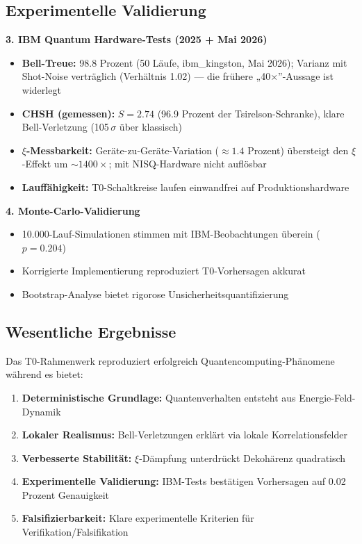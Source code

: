\subsection{Experimentelle Validierung}

\textbf{3. IBM Quantum Hardware-Tests (2025 + Mai 2026)}
\begin{itemize}
	\item \textbf{Bell-Treue:} 98.8 Prozent (50 Läufe, ibm\_kingston, Mai 2026); Varianz mit Shot-Noise verträglich (Verhältnis 1.02) --- die frühere „40×''-Aussage ist widerlegt
	\item \textbf{CHSH (gemessen):} $S = 2.74$ (96.9 Prozent der Tsirelson-Schranke), klare Bell-Verletzung (105\,$\sigma$ über klassisch)
	\item \textbf{$\xi$-Messbarkeit:} Geräte-zu-Geräte-Variation ($\approx 1.4$ Prozent) übersteigt den $\xi$-Effekt um $\sim 1400\times$; mit NISQ-Hardware nicht auflösbar
	\item \textbf{Lauffähigkeit:} T0-Schaltkreise laufen einwandfrei auf Produktionshardware
\end{itemize}

\textbf{4. Monte-Carlo-Validierung}
\begin{itemize}
	\item 10.000-Lauf-Simulationen stimmen mit IBM-Beobachtungen überein ($p = 0.204$)
	\item Korrigierte Implementierung reproduziert T0-Vorhersagen akkurat
	\item Bootstrap-Analyse bietet rigorose Unsicherheitsquantifizierung
\end{itemize}

\subsection{Wesentliche Ergebnisse}

\begin{keyresult}
	Das T0-Rahmenwerk reproduziert erfolgreich Quantencomputing-Phänomene während es bietet:
	\begin{enumerate}
		\item \textbf{Deterministische Grundlage:} Quantenverhalten entsteht aus Energie-Feld-Dynamik
		\item \textbf{Lokaler Realismus:} Bell-Verletzungen erklärt via lokale Korrelationsfelder
		\item \textbf{Verbesserte Stabilität:} $\xi$-Dämpfung unterdrückt Dekohärenz quadratisch
		\item \textbf{Experimentelle Validierung:} IBM-Tests bestätigen Vorhersagen auf 0.02 Prozent Genauigkeit
		\item \textbf{Falsifizierbarkeit:} Klare experimentelle Kriterien für Verifikation/Falsifikation
	\end{enumerate}
\end{keyresult}

